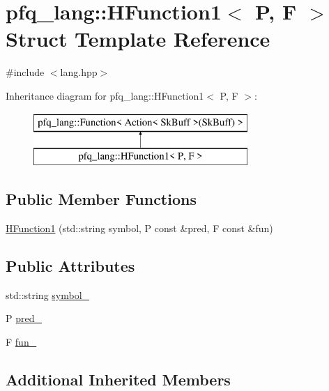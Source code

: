 \hypertarget{structpfq__lang_1_1HFunction1}{\section{pfq\+\_\+lang\+:\+:H\+Function1$<$ P, F $>$ Struct Template Reference}
\label{structpfq__lang_1_1HFunction1}
}


{\ttfamily \#include $<$lang.\+hpp$>$}

Inheritance diagram for pfq\+\_\+lang\+:\+:H\+Function1$<$ P, F $>$\+:\begin{figure}[H]
\begin{center}
\leavevmode
\includegraphics[height=2.000000cm]{structpfq__lang_1_1HFunction1}
\end{center}
\end{figure}
\subsection*{Public Member Functions}
\begin{DoxyCompactItemize}
\item 
\hyperlink{structpfq__lang_1_1HFunction1_ae7edffd30248e1ec3d151326bd3d2cb8}{H\+Function1} (std\+::string symbol, P const \&pred, F const \&fun)
\end{DoxyCompactItemize}
\subsection*{Public Attributes}
\begin{DoxyCompactItemize}
\item 
std\+::string \hyperlink{structpfq__lang_1_1HFunction1_a887acb41567eabcdf4bc02d04b5250ea}{symbol\+\_\+}
\item 
P \hyperlink{structpfq__lang_1_1HFunction1_a2b27dcdb7b9183f330438e650a36aa42}{pred\+\_\+}
\item 
F \hyperlink{structpfq__lang_1_1HFunction1_a24ea2e91b39b0eb547df29785b9a440c}{fun\+\_\+}
\end{DoxyCompactItemize}
\subsection*{Additional Inherited Members}


